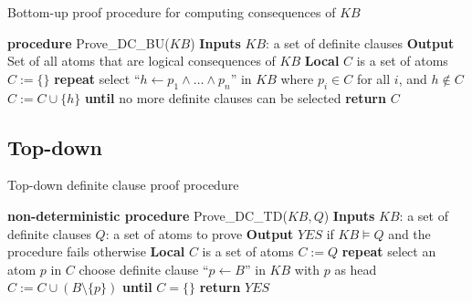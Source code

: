 \documentclass[12pt,a4paper, brazil]{article}
\begin{document}
\begin{algorithm}[!ht]
  \caption{Bottom-up proof procedure for computing consequences of \( KB \)}
  \begin{algorithmic}[1]
  \STATE \textbf{procedure} Prove\_DC\_BU(\( KB \))
  \STATE \textbf{Inputs}
  \STATE \quad \( KB \): a set of definite clauses
  \STATE \textbf{Output}
  \STATE \quad Set of all atoms that are logical consequences of \( KB \)
  \STATE \textbf{Local}
  \STATE \quad \( C \) is a set of atoms
  \STATE \quad \( C := \{\} \)
  \STATE \textbf{repeat}
  \STATE \quad select “\( h \leftarrow p_1 \land \ldots \land p_n \)” in \( KB \) where \( p_i \in C \) for all \( i \), and \( h \notin C \)
  \STATE \quad \( C := C \cup \{h\} \)
  \STATE \textbf{until} no more definite clauses can be selected
  \STATE \textbf{return} \( C \)
  \end{algorithmic}
  \end{algorithm}

\subsection{Top-down}

  \begin{algorithm}
    \caption{Top-down definite clause proof procedure}
    \label{alg:prove-dc-td}
    \begin{algorithmic}[1]
    \STATE \textbf{non-deterministic procedure} Prove\_DC\_TD(\( KB, Q \))
    \STATE \textbf{Inputs}
    \STATE \quad \( KB \): a set of definite clauses
    \STATE \quad \( Q \): a set of atoms to prove
    \STATE \textbf{Output}
    \STATE \quad \( YES \) if \( KB \models Q \) and the procedure fails otherwise
    \STATE \textbf{Local}
    \STATE \quad \( C \) is a set of atoms
    \STATE \quad \( C := Q \)
    \STATE \textbf{repeat}
    \STATE \quad select an atom \( p \) in \( C \)
    \STATE \quad choose definite clause “\( p \leftarrow B \)” in \( KB \) with \( p \) as head
    \STATE \quad \( C := C \cup (B \setminus \{p\}) \)
    \STATE \textbf{until} \( C = \{\} \)
    \STATE \textbf{return} \( YES \)
    \end{algorithmic}
    \end{algorithm}



\printbibliography
\end{document}
